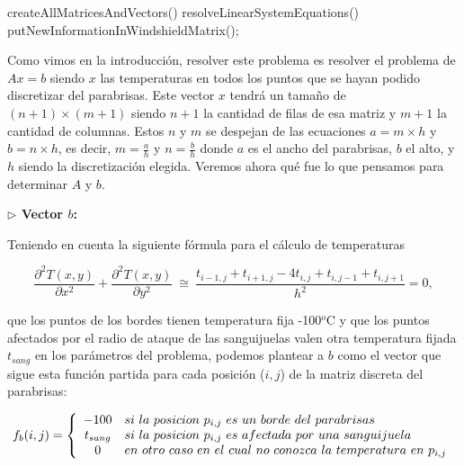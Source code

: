 \vspace{\baselineskip}
\begin{codebox}
\li createAllMatricesAndVectors()
\li resolveLinearSystemEquations()
\li putNewInformationInWindshieldMatrix();
\End
\end{codebox} 
\vspace{\baselineskip}
\par
Como vimos en la introducción, resolver este problema es resolver el problema de $Ax = b$ siendo $x$ las temperaturas en todos los puntos que se hayan podido discretizar del parabrisas. Este vector $x$ tendrá un tamaño de $(n+1) \times (m+1)$ siendo $n+1$ la cantidad de filas de esa matriz y $m+1$ la cantidad de columnas. Estos $n$ y $m$ se despejan de las ecuaciones $a = m \times h$ y $b = n \times h$, es decir, $m = \frac{a}{h}$ y $n = \frac{b}{h}$ donde $a$ es el ancho del parabrisas, $b$ el alto, y $h$ siendo la discretización elegida. Veremos ahora qué fue lo que pensamos para determinar $A$ y $b$.

\vspace{\baselineskip}

\vspace{\baselineskip}

{\large \textbf{ $\rhd$ Vector $b$:}}

\vspace{\baselineskip}

 Teniendo en cuenta la siguiente fórmula para el cálculo de temperaturas

\[
\frac{\partial^2T(x,y)}{\partial x^{2}}+\frac{\partial^2 T(x,y)}{\partial y^{2}} \ \cong \ \frac{ t_{i-1,j} + t_{i+1,j} - 4t_{i,j} + t_{i,j-1} + t_{i,j+1}}{h^2} = 0,
\]

que los puntos de los bordes tienen temperatura fija -100${}^o$C y que los puntos afectados por el radio de ataque de las sanguijuelas valen otra temperatura fijada $t_{sang}$ en los parámetros del problema, podemos plantear a $b$ como el vector que sigue esta función partida para cada posición ($i,j$) de la matriz discreta del parabrisas:

$$f_{b}(i,j) = \left\{
\begin{array}{c l}
 -100 & si \ la \ posicion  \ p_{i,j} \ es  \ un \ borde  \ del \ parabrisas\\
 t_{sang} & si \ la \ posicion  \ p_{i,j} \ es \ afectada \ por \ una \ sanguijuela \\
 0 & en \ otro \ caso \ en \ el \ cual \ no \ conozca \ la \ temperatura \ en \ p_{i,j}
\end{array}
\right.
$$

